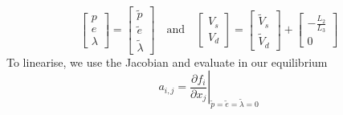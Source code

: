 \begin{equation}
    \begin{bmatrix}
        p \\ e \\ \lambda
    \end{bmatrix}
    =
    \begin{bmatrix}
        \tilde{p} \\ \tilde{e} \\ \tilde{\lambda}
    \end{bmatrix}
    \quad \text{and} \quad
    \begin{bmatrix}
        V_s \\ V_d
    \end{bmatrix}
    =
    \begin{bmatrix}
        \tilde{V}_s \\ \tilde{V}_d
    \end{bmatrix}
    +
    \begin{bmatrix}
        -\frac{L_2}{L_3} \\ 0
    \end{bmatrix}
\end{equation}
To linearise, we use the Jacobian and evaluate in our equilibrium
\begin{equation}
    a_{i,j} = \left. \frac{\partial f_i}{\partial x_j} \right 
    |_{\tilde{p} = \tilde{e} = \tilde{\lambda} = 0}
\end{equation}

